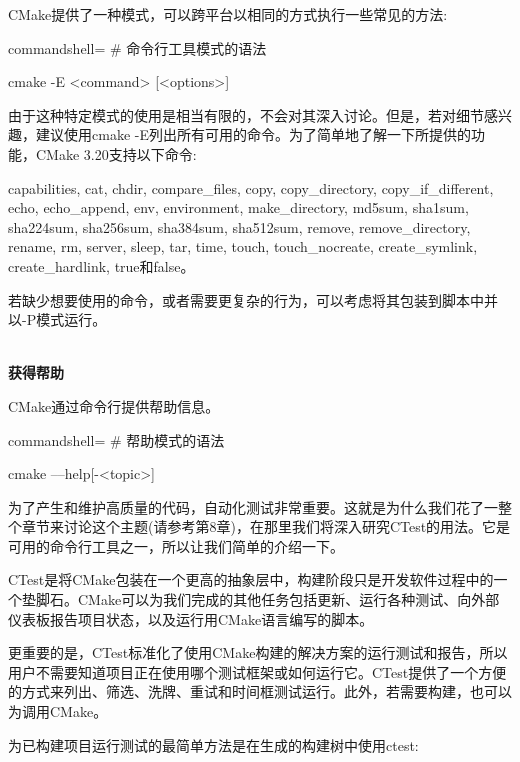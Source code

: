 CMake提供了一种模式，可以跨平台以相同的方式执行一些常见的方法:

\begin{tcblisting}{commandshell={}}
# 命令行工具模式的语法

cmake -E <command> [<options>]
\end{tcblisting}

由于这种特定模式的使用是相当有限的，不会对其深入讨论。但是，若对细节感兴趣，建议使用cmake -E列出所有可用的命令。为了简单地了解一下所提供的功能，CMake 3.20支持以下命令:

capabilities, cat, chdir, compare\_files, copy, copy\_directory, copy\_if\_different, echo, echo\_append, env, environment, make\_directory, md5sum, sha1sum, sha224sum, sha256sum, sha384sum, sha512sum, remove, remove\_directory, rename, rm, server, sleep, tar, time, touch, touch\_nocreate, create\_symlink, create\_hardlink, true和false。
 
若缺少想要使用的命令，或者需要更复杂的行为，可以考虑将其包装到脚本中并以-P模式运行。

\hspace*{\fill} \\ %
\noindent
\textbf{获得帮助}

CMake通过命令行提供帮助信息。

\begin{tcblisting}{commandshell={}}
# 帮助模式的语法

cmake ––help[-<topic>]
\end{tcblisting}


为了产生和维护高质量的代码，自动化测试非常重要。这就是为什么我们花了一整个章节来讨论这个主题(请参考第8章)，在那里我们将深入研究CTest的用法。它是可用的命令行工具之一，所以让我们简单的介绍一下。

CTest是将CMake包装在一个更高的抽象层中，构建阶段只是开发软件过程中的一个垫脚石。CMake可以为我们完成的其他任务包括更新、运行各种测试、向外部仪表板报告项目状态，以及运行用CMake语言编写的脚本。

更重要的是，CTest标准化了使用CMake构建的解决方案的运行测试和报告，所以用户不需要知道项目正在使用哪个测试框架或如何运行它。CTest提供了一个方便的方式来列出、筛选、洗牌、重试和时间框测试运行。此外，若需要构建，也可以为调用CMake。

为已构建项目运行测试的最简单方法是在生成的构建树中使用ctest:


